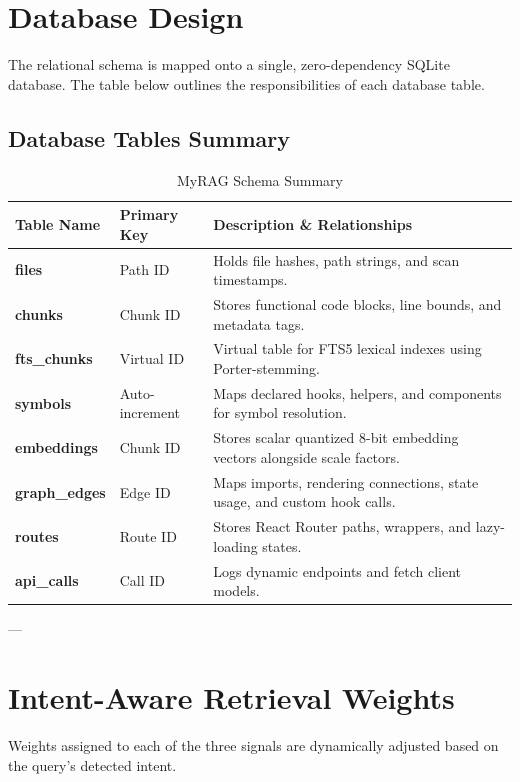 \documentclass[11pt,a4paper]{article}
\begin{document}
\section{Database Design}
The relational schema is mapped onto a single, zero-dependency SQLite database. The table below outlines the responsibilities of each database table.

\subsection{Database Tables Summary}
\begin{table}[h!]
\centering
\begin{tabular}{llp{7.5cm}}
\toprule
\bfseries Table Name & \bfseries Primary Key & \bfseries Description \& Relationships \\
\midrule
\rowcolor{lightbg}
\bfseries files & Path ID & Holds file hashes, path strings, and scan timestamps. \\
\bfseries chunks & Chunk ID & Stores functional code blocks, line bounds, and metadata tags. \\
\rowcolor{lightbg}
\bfseries fts\_chunks & Virtual ID & Virtual table for FTS5 lexical indexes using Porter-stemming. \\
\bfseries symbols & Auto-increment & Maps declared hooks, helpers, and components for symbol resolution. \\
\rowcolor{lightbg}
\bfseries embeddings & Chunk ID & Stores scalar quantized 8-bit embedding vectors alongside scale factors. \\
\bfseries graph\_edges & Edge ID & Maps imports, rendering connections, state usage, and custom hook calls. \\
\rowcolor{lightbg}
\bfseries routes & Route ID & Stores React Router paths, wrappers, and lazy-loading states. \\
\bfseries api\_calls & Call ID & Logs dynamic endpoints and fetch client models. \\
\bottomrule
\end{tabular}
\caption{MyRAG Schema Summary}
\end{table}

---

\section{Intent-Aware Retrieval Weights}
Weights assigned to each of the three signals are dynamically adjusted based on the query's detected intent.
\end{document}
